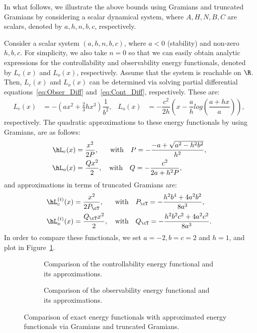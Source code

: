 In what follows, we illustrate the above bounds using Gramians and truncated Gramians by considering a scalar dynamical system, where $A,H,N,B,C$ are scalars, denoted by $a,h,n,b,c$, respectively.
\begin{example}
 Consider a scalar system $(a,h,n,b,c)$, where $a<0$ (stability) and non-zero $h,b,c$. For simplicity, we also take $n = 0$ so that we can easily obtain analytic expressions for the controllability  and observability energy functionals, denoted by $L_c(x)$ and $L_o(x)$, respectively. Assume that the system is reachable on $\R$. Then, $L_c(x)$ and $L_o(x)$ can be  determined via solving partial differential equations~\eqref{eq:Obser_Diff} and~\eqref{eq:Cont_Diff}, respectively. These are:
 \begin{align*}
  L_c(x) &= - \left(ax^2  + \tfrac{2}{3}hx^3\right)\dfrac{1}{b^2},&
  L_o(x) &= -\dfrac{c^2}{2h}\left(x - \dfrac{a}{h}log\left(\dfrac{a+hx}{a}\right)\right),
 \end{align*}
 respectively. The quadratic approximations to these energy functionals by using Gramians, are as follows:
\begin{align*}
\hL_c(x) &= \dfrac{x^2}{2P}, \quad ~~ \text{with} \quad P = -\dfrac{-a + \sqrt{a^2 - h^2b^2}}{h^2},\\
\hL_o(x) &= \dfrac{Qx^2}{2},\quad \text{with} \quad Q = -\dfrac{c^2}{2a+h^2P},
\end{align*}
and approximations in terms of truncated Gramians are:
\begin{align*}
\hL^{(t)}_c(x) &= \dfrac{x^2}{2P_\cT}, \quad ~~ \text{with} \quad P_\cT = -\dfrac{h^2b^4+4a^2b^2}{8a^3},\\
\hL^{(t)}_o(x) &= \dfrac{Q_\cT x^2}{2},\quad \text{with} \quad Q_\cT  = -\dfrac{h^2b^2c^2+4a^2c^2}{8a^3}.
\end{align*}
In order to compare these functionals, we set $a =-2,b=c=2$ and $h =1$, and plot in Figure~\ref{fig:comparison_gram}.

\begin{figure}[h]
 \begin{subfigure}[h]{0.49\textwidth}
\centering
	\setlength\fheight{3cm}
	\setlength{}
	\caption{Comparison of the controllability energy functional  and its approximations.}
   \end{subfigure}
    \begin{subfigure}[h]{0.49\textwidth}
\centering
	\setlength\fheight{3cm}
	\setlength\fwidth{5.0cm}
	\caption{Comparison of the observability energy functional and its approximations.}
   \end{subfigure}
   \caption{Comparison of exact energy functionals with approximated energy functionals via Gramians and truncated Gramians.}
   \label{fig:comparison_gram}
\end{figure}


\end{example}
